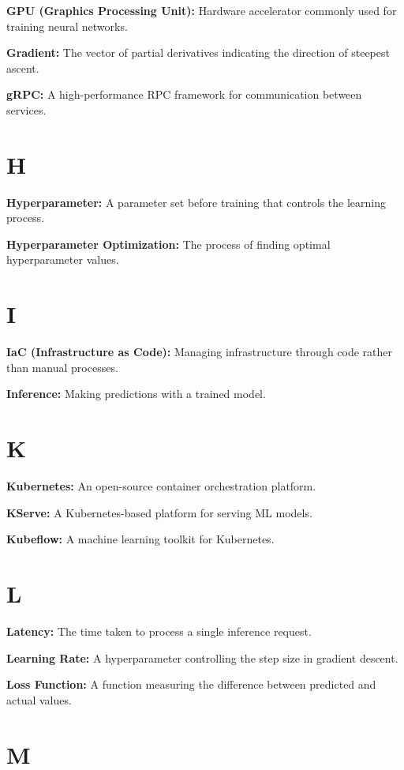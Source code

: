 \textbf{GPU (Graphics Processing Unit):} Hardware accelerator commonly used for training neural networks.

\textbf{Gradient:} The vector of partial derivatives indicating the direction of steepest ascent.

\textbf{gRPC:} A high-performance RPC framework for communication between services.

\section*{H}

\textbf{Hyperparameter:} A parameter set before training that controls the learning process.

\textbf{Hyperparameter Optimization:} The process of finding optimal hyperparameter values.

\section*{I}

\textbf{IaC (Infrastructure as Code):} Managing infrastructure through code rather than manual processes.

\textbf{Inference:} Making predictions with a trained model.

\section*{K}

\textbf{Kubernetes:} An open-source container orchestration platform.

\textbf{KServe:} A Kubernetes-based platform for serving ML models.

\textbf{Kubeflow:} A machine learning toolkit for Kubernetes.

\section*{L}

\textbf{Latency:} The time taken to process a single inference request.

\textbf{Learning Rate:} A hyperparameter controlling the step size in gradient descent.

\textbf{Loss Function:} A function measuring the difference between predicted and actual values.

\section*{M}


